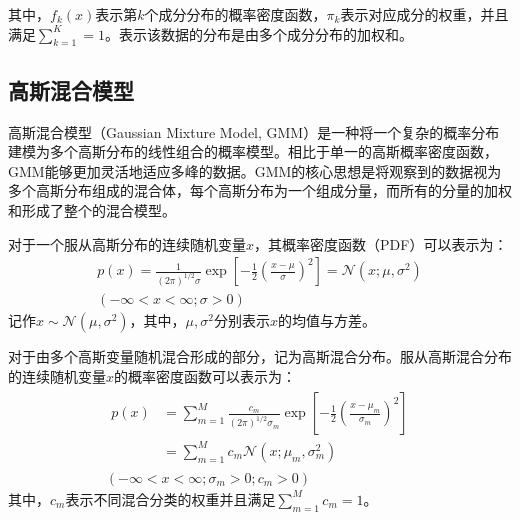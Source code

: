 其中，$f_k(x)$表示第$k$个成分分布的概率密度函数，$\pi_k$表示对应成分的权重，并且满足$\sum_{k=1}^{K}=1$。表示该数据的分布是由多个成分分布的加权和。

\subsection{高斯混合模型}
高斯混合模型（Gaussian Mixture Model, GMM）是一种将一个复杂的概率分布建模为多个高斯分布的线性组合的概率模型。相比于单一的高斯概率密度函数，GMM能够更加灵活地适应多峰的数据。GMM的核心思想是将观察到的数据视为多个高斯分布组成的混合体，每个高斯分布为一个组成分量，而所有的分量的加权和形成了整个的混合模型。

对于一个服从高斯分布的连续随机变量$x$，其概率密度函数（PDF）可以表示为：
\begin{equation}
    \begin{gathered}
        p\left( x \right) =\frac{1}{\left( 2\pi \right) ^{1/2}\sigma}\exp \left[ -\frac{1}{2}\left( \frac{x-\mu}{\sigma} \right) ^2 \right] =\mathcal{N} \left( x;\mu ,\sigma ^2 \right)
        \\
        \left( -\infty <x<\infty ;\sigma >0 \right)
    \end{gathered}
\end{equation}
记作$x \sim \mathcal{N}(\mu,\sigma^2)$，其中，$\mu,\sigma^2$分别表示$x$的均值与方差。

对于由多个高斯变量随机混合形成的部分，记为高斯混合分布。服从高斯混合分布的连续随机变量$x$的概率密度函数可以表示为：
\begin{equation}
    \begin{gathered}
        \begin{aligned}
            p(x) & =\sum_{m=1}^M \frac{c_m}{(2 \pi)^{1 / 2} \sigma_m} \exp \left[-\frac{1}{2}\left(\frac{x-\mu_m}{\sigma_m}\right)^2\right] \\ & =\sum_{m=1}^M c_m \mathcal{N}\left(x ; \mu_m, \sigma_m^2\right)
        \end{aligned}
        \\
        \left(-\infty<x<\infty ; \sigma_m>0 ; c_m>0\right)
    \end{gathered}
\end{equation}
其中，$c_m$表示不同混合分类的权重并且满足$\sum_{m=1}^M c_m=1$。

